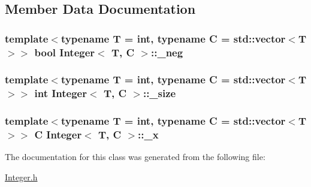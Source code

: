 \subsection{Member Data Documentation}
\hypertarget{classInteger_a7efd1cec7874908d43b7d28708754bbf}{
\subsubsection[{\-\_\-neg}]{\setlength{\rightskip}{0pt plus 5cm}template$<$typename T  = int, typename C  = std\-::vector$<$\-T$>$$>$ bool {\bf Integer}$<$ T, C $>$\-::\-\_\-neg\hspace{0.3cm}{\ttfamily [private]}}}\label{classInteger_a7efd1cec7874908d43b7d28708754bbf}
\hypertarget{classInteger_aa629450a7423b6e45d6f0906fde12496}{
\subsubsection[{\-\_\-size}]{\setlength{\rightskip}{0pt plus 5cm}template$<$typename T  = int, typename C  = std\-::vector$<$\-T$>$$>$ int {\bf Integer}$<$ T, C $>$\-::\-\_\-size\hspace{0.3cm}{\ttfamily [private]}}}\label{classInteger_aa629450a7423b6e45d6f0906fde12496}
\hypertarget{classInteger_a19f83aa8d5d86634885eb63d15bcdb6d}{
\subsubsection[{\-\_\-x}]{\setlength{\rightskip}{0pt plus 5cm}template$<$typename T  = int, typename C  = std\-::vector$<$\-T$>$$>$ C {\bf Integer}$<$ T, C $>$\-::\-\_\-x\hspace{0.3cm}{\ttfamily [private]}}}\label{classInteger_a19f83aa8d5d86634885eb63d15bcdb6d}


The documentation for this class was generated from the following file\-:\begin{DoxyCompactItemize}
\item 
\hyperlink{Integer_8h}{Integer.\-h}\end{DoxyCompactItemize}
